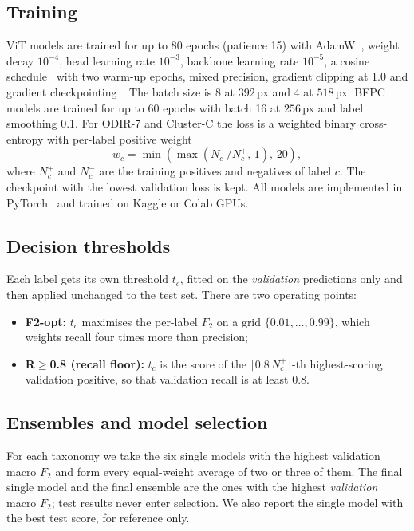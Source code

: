 ﻿\documentclass[conference]{IEEEtran}
\begin{document}
\subsection{Training}
ViT models are trained for up to 80 epochs (patience 15) with AdamW~\cite{loshchilov2019adamw}, weight decay $10^{-4}$, head learning rate $10^{-3}$, backbone learning rate $10^{-5}$, a cosine schedule~\cite{loshchilov2017sgdr} with two warm-up epochs, mixed precision, gradient clipping at 1.0 and gradient checkpointing~\cite{chen2016checkpointing}. The batch size is 8 at $392$\,px and 4 at $518$\,px.
BFPC models are trained for up to 60 epochs with batch 16 at $256$\,px and label smoothing 0.1.
For ODIR-7 and Cluster-C the loss is a weighted binary cross-entropy with per-label positive weight
\begin{equation}
w_c=\min\!\left(\max\!\left(N_c^-/N_c^+,\,1\right),\,20\right),
\end{equation}
where $N_c^+$ and $N_c^-$ are the training positives and negatives of label $c$.
The checkpoint with the lowest validation loss is kept.
All models are implemented in PyTorch~\cite{paszke2019pytorch} and trained on Kaggle or Colab GPUs.

\subsection{Decision thresholds}
Each label gets its own threshold $t_c$, fitted on the \emph{validation} predictions only and then applied unchanged to the test set. There are two operating points:
\begin{itemize}
\item \textbf{F2-opt:} $t_c$ maximises the per-label $F_2$ on a grid $\{0.01,\dots,0.99\}$, which weights recall four times more than precision;
\item \textbf{R$\geq$0.8 (recall floor):} $t_c$ is the score of the $\lceil 0.8\,N_c^+\rceil$-th highest-scoring validation positive, so that validation recall is at least 0.8.
\end{itemize}

\subsection{Ensembles and model selection}
For each taxonomy we take the six single models with the highest validation macro $F_2$ and form every equal-weight average of two or three of them.
The final single model and the final ensemble are the ones with the highest \emph{validation} macro $F_2$; test results never enter selection.
We also report the single model with the best test score, for reference only.
\end{document}
